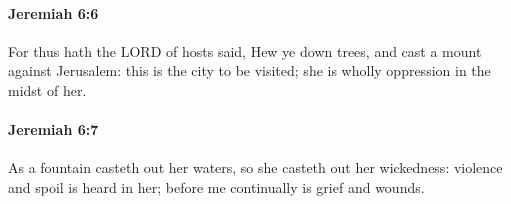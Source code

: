 		\paragraph{Jeremiah 6:6} %
			\label{JEREMIAH-6-6}

			For thus hath the LORD of hosts said, Hew ye down trees, and cast a mount against Jerusalem: this is the city to be visited; she is wholly oppression in the midst of her.


		\paragraph{Jeremiah 6:7} %
			\label{JEREMIAH-6-7}

			As a fountain casteth out her waters, so she casteth out her wickedness: violence and spoil is heard in her; before me continually is grief and wounds.


